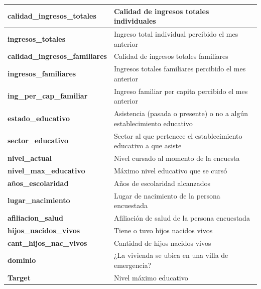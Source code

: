\documentclass[a4paper]{article}
\begin{document}
\begin{table}[H]
\begin{tabular}{|l|l|}
        \textbf{calidad\_ingresos\_totales}    & Calidad de ingresos totales individuales \\ \hline
        \textbf{ingresos\_totales}             & Ingreso total individual percibido el mes anterior \\ \hline
        \textbf{calidad\_ingresos\_familiares} & Calidad de ingresos totales familiares \\ \hline
        \textbf{ingresos\_familiares}          & Ingresos totales familiares percibido el mes anterior \\ \hline
        \textbf{ing\_per\_cap\_familiar}       & Ingreso familiar per capita percibido el mes anterior \\ \hline
        \textbf{estado\_educativo}             & Asistencia (pasada o presente) o no a algún establecimiento educativo \\ \hline
        \textbf{sector\_educativo}             & Sector al que pertenece el establecimiento educativo a que asiste \\ \hline
        \textbf{nivel\_actual}                 & Nivel cursado al momento de la encuesta \\ \hline
        \textbf{nivel\_max\_educativo}         & Máximo nivel educativo que se cursó \\ \hline
        \textbf{años\_escolaridad}             & Años de escolaridad alcanzados \\ \hline
        \textbf{lugar\_nacimiento}             & Lugar de nacimiento de la persona encuestada \\ \hline
        \textbf{afiliacion\_salud}             & Afiliación de salud de la persona encuestada \\ \hline
        \textbf{hijos\_nacidos\_vivos}         & Tiene o tuvo hijos nacidos vivos \\ \hline
        \textbf{cant\_hijos\_nac\_vivos}       & Cantidad de hijos nacidos vivos \\ \hline
        \textbf{dominio}                       & ¿La vivienda se ubica en una villa de emergencia? \\ \hline
        \textbf{Target}                        & Nivel máximo educativo \\ \hline
    \end{tabular}
    \end{table}
 
    \newpage
\end{document}
